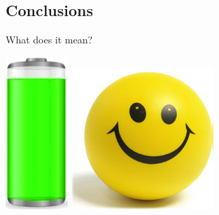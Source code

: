 \documentclass[a2,landscape]{a0poster}
\begin{document}
\begin{center}
\section*{Conclusions}
\end{center}

What does it mean?\\
\begin{center}
\includegraphics[scale=0.7]{plots/full_battery}
\includegraphics[scale=0.7]{plots/happy_face}
\end{center}
\end{document}
